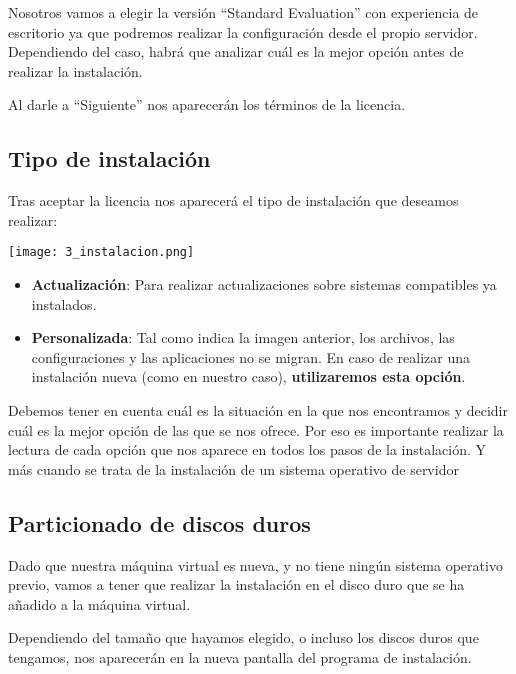 Nosotros vamos a elegir la versión “Standard Evaluation” con experiencia de escritorio ya que podremos realizar la configuración desde el propio servidor. Dependiendo del caso, habrá que analizar cuál es la mejor opción antes de realizar la instalación.

Al darle a “Siguiente” nos aparecerán los términos de la licencia.

\subsection{Tipo de instalación}
Tras aceptar la licencia nos aparecerá el tipo de instalación que deseamos realizar:
\begin{center}
    \vspace{-10pt}
    \texttt{[image: 3\_instalacion.png]}
    \vspace{-10pt}
\end{center}

\begin{itemize}
    \item \textbf{Actualización}: Para realizar actualizaciones sobre sistemas compatibles ya instalados.
    \item \textbf{Personalizada}: Tal como indica la imagen anterior, los archivos, las configuraciones y las aplicaciones no se migran. En caso de realizar una instalación nueva (como en nuestro caso), \textbf{utilizaremos esta opción}.
\end{itemize}

Debemos tener en cuenta cuál es la situación en la que nos encontramos y decidir cuál es la mejor opción de las que se nos ofrece. Por eso es importante realizar la lectura de cada opción que nos aparece en todos los pasos de la instalación. Y más cuando se trata de la instalación de un sistema operativo de servidor


\subsection{Particionado de discos duros}
Dado que nuestra máquina virtual es nueva, y no tiene ningún sistema operativo previo, vamos a tener que realizar la instalación en el disco duro que se ha añadido a la máquina virtual.

Dependiendo del tamaño que hayamos elegido, o incluso los discos duros que tengamos, nos aparecerán en la nueva pantalla del programa de instalación.

